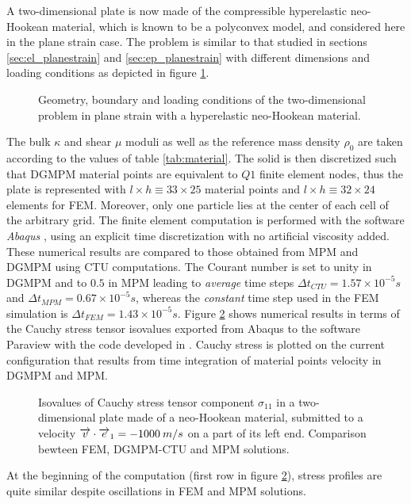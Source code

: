 A two-dimensional plate is now made of the compressible hyperelastic neo-Hookean material, which is known to be a polyconvex model, and considered here in the plane strain case. The problem is similar to that studied in sections \ref{sec:el_planestrain} and \ref{sec:ep_planestrain} with different dimensions and loading conditions as depicted in figure \ref{fig:2d_heDomain}.
\begin{figure}[h!]
  \centering
  
  \caption{Geometry, boundary and loading conditions of the two-dimensional problem in plane strain with a hyperelastic neo-Hookean material.}
  \label{fig:2d_heDomain}
\end{figure}
The bulk $\kappa$ and shear $\mu$ moduli as well as the reference mass density $\rho_0$ are taken according to the values of table \ref{tab:material}.  The solid is then discretized such that DGMPM material points are equivalent to $Q1$ finite element nodes, thus the plate is represented with $l \times h \equiv 33 \times 25$ material points and $l \times h \equiv 32 \times 24$ elements for FEM. Moreover, only one particle lies at the center of each cell of the arbitrary grid. The finite element computation is performed with the software \textit{Abaqus} \cite{Abaqus}, using an explicit time discretization with no artificial viscosity added. These numerical results are compared to those obtained from MPM and DGMPM using CTU computations. The Courant number is set to unity in DGMPM and to $0.5$ in MPM leading to \textit{average} time steps $\Delta t_{CTU}=1.57 \times 10^{-5}s$ and $\Delta t_{MPM}=0.67 \times 10^{-5}s$, whereas the \textit{constant} time step used in the FEM simulation is $\Delta t_ {FEM}=1.43 \times 10^{-5} s$. Figure \ref{fig:2dhe_stress} shows numerical results in terms of the Cauchy stress tensor isovalues exported from Abaqus to the software Paraview \cite{Paraview} with the code developed in \cite{Export_Abaqus}. Cauchy stress is plotted on the current configuration that results from time integration of material points velocity in DGMPM and MPM.
\begin{figure}[h!]
  \centering
  
  \caption{Isovalues of Cauchy stress tensor component $\sigma_{11}$ in a two-dimensional plate made of a neo-Hookean material, submitted to a velocity ${\overrightarrow{v}}\cdot{\overrightarrow{e}}_1=-1000 \: m/s$ on a part of its left end. Comparison bewteen FEM, DGMPM-CTU and MPM solutions.}
  \label{fig:2dhe_stress}
\end{figure}
At the beginning of the computation (first row in figure \ref{fig:2dhe_stress}), stress profiles are quite similar despite oscillations in FEM and MPM solutions. 
